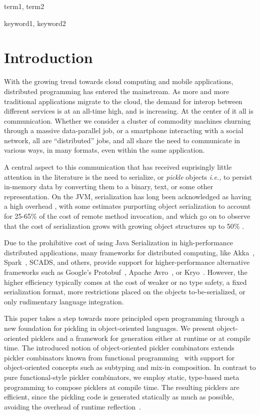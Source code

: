 \documentclass[preprint,10pt]{sigplanconf}
\begin{document}

\terms
term1, term2

\keywords
keyword1, keyword2

\section{Introduction}

With the growing trend towards cloud computing and mobile applications,
distributed programming has entered the mainstream. As more and more
traditional applications migrate to the cloud, the demand for interop between
different services is at an all-time high, and is increasing. At the center of
it all is communication. Whether we consider a cluster of commodity machines
churning through a massive data-parallel job, or a smartphone interacting with
a social network, all are ``distributed'' jobs, and all share the need to
communicate in various ways, in many formats, even within the same
application.

A central aspect to this communication that has received suprisingly little
attention in the literature is the need to serialize, or {\em pickle} objects
{\em i.e.,} to persist in-memory data by converting them to a binary, text, or
some other representation. On the JVM, serialization has long been
acknowledged as having a high overhead \cite{Welsh2000, Carpenter1999}, with
some estimates purporting object serialization to account for 25-65\% of the
cost of remote method invocation, and which go on to observe that the cost of
serialization grows with growing object structures up to 50\%
\cite{Philippsen2000, Maassen1999}.

Due to the prohibitive cost of using Java Serialization in high-performance
distributed applications, many frameworks for distributed computing, like
Akka~\cite{Akka}, Spark~\cite{Zaharia2012}, SCADS, and others, provide support
for higher-performance alternative frameworks such as Google's
Protobuf~\cite{Protobuf}, Apache Avro~\cite{Avro}, or Kryo~\cite{Kryo}.
However, the higher efficiency typically comes at the cost of weaker or no
type safety, a fixed serialization format, more restrictions placed on the
objects to-be-serialized, or only rudimentary language integration.

This paper takes a step towards more principled open programming through a new
foundation for pickling in object-oriented languages. We present object-oriented
picklers and a framework for generation either at runtime or at
compile time. The introduced notion of object-oriented pickler combinators
extends pickler combinators known from functional
programming~\cite{Kennedy2004} with support for object-oriented concepts such
as subtyping and mix-in composition. In contrast to pure functional-style
pickler combinators, we employ static, type-based meta programming to compose
picklers at compile time. The resulting picklers are efficient, since the
pickling code is generated statically as much as possible, avoiding the
overhead of runtime reflection~\cite{Gil2008,Dubochet2011}.
\end{document}
